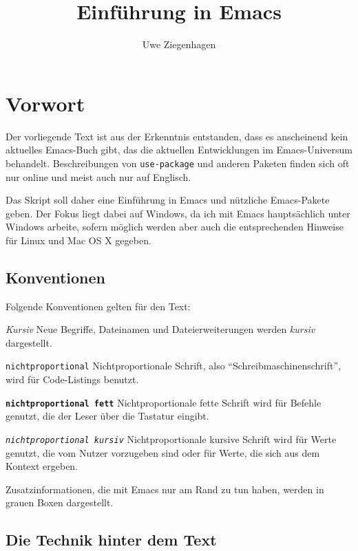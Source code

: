 \documentclass[12pt,ngerman]{scrbook}
\title{Einführung in Emacs}
\author{Uwe Ziegenhagen}
\begin{document}
\maketitle

\frontmatter

\tableofcontents


\chapter*{Vorwort}

Der vorliegende Text ist aus der Erkenntnis entstanden, dass es anscheinend kein aktuelles Emacs-Buch gibt, das die aktuellen Entwicklungen im Emacs-Universum behandelt. Beschreibungen von \texttt{use-package} und anderen Paketen finden sich oft nur online und meist auch nur auf Englisch. 

Das Skript soll daher eine Einführung in Emacs und nützliche Emacs-Pakete geben. Der Fokus liegt dabei auf Windows, da ich mit Emacs hauptsächlich unter Windows arbeite,  sofern möglich werden aber auch die entsprechenden Hinweise für Linux und Mac OS X gegeben. 

\section*{Konventionen}

Folgende Konventionen gelten für den Text:

\textit{Kursiv} Neue Begriffe, Dateinamen und Dateierweiterungen werden \textit{kursiv} dargestellt.

\texttt{nichtproportional} Nichtproportionale Schrift, also \enquote{Schreibmaschinenschrift}, wird für Code-Listings benutzt.

\texttt{\bfseries nichtproportional fett} Nichtproportionale fette Schrift wird für Befehle genutzt, die der Leser über die Tastatur eingibt.

\texttt{\textit{nichtproportional kursiv}} Nichtproportionale kursive Schrift wird für Werte genutzt, die vom Nutzer vorzugeben sind oder für Werte, die sich aus dem Kontext ergeben.


Zusatzinformationen, die mit Emacs nur am Rand zu tun haben, werden in grauen Boxen dargestellt.


\section*{Die Technik hinter dem Text}
\end{document}
